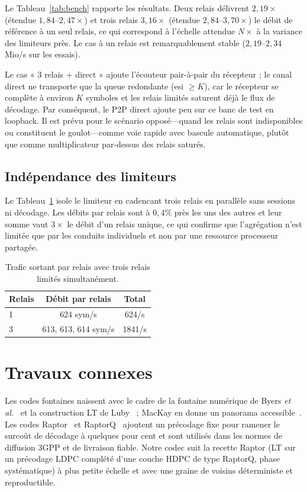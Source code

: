\documentclass[conference]{IEEEtran}
\begin{document}
Le Tableau~\ref{tab:bench} rapporte les résultats. Deux relais délivrent
$2{,}19\times$ (étendue $1{,}84$--$2{,}47\times$) et trois relais $3{,}16\times$
(étendue $2{,}84$--$3{,}70\times$) le débit de référence à un seul relais, ce
qui correspond à l'échelle attendue $N\times$ à la variance des limiteurs près.
Le cas à un relais est remarquablement stable ($2{,}19$--$2{,}34$\,Mio/s sur
les essais).

Le cas « 3 relais + direct » ajoute l'écouteur pair-à-pair du récepteur ; le
canal direct ne transporte que la queue redondante (esi $\ge K$), car le
récepteur se complète à environ $K$ symboles et les relais limités saturent
déjà le flux de décodage. Par conséquent, le P2P direct ajoute peu sur ce banc
de test en loopback. Il est prévu pour le scénario opposé---quand les relais
sont indisponibles ou constituent le goulot---comme voie rapide avec bascule
automatique, plutôt que comme multiplicateur par-dessus des relais saturés.

\subsection{Indépendance des limiteurs}
Le Tableau~\ref{tab:throttle} isole le limiteur en cadencant trois relais en
parallèle sans sessions ni décodage. Les débits par relais sont à $0{,}4\%$
près les uns des autres et leur somme vaut $3\times$ le débit d'un relais
unique, ce qui confirme que l'agrégation n'est limitée que par les conduits
individuels et non par une ressource processeur partagée.

\begin{table}[!t]
\centering
\caption{Trafic sortant par relais avec trois relais limités simultanément.}
\label{tab:throttle}
\begin{tabular}{@{}lcc@{}}
\toprule
Relais & Débit par relais & Total \\
\midrule
1 & 624 sym/s & 624/s \\
3 & 613, 613, 614 sym/s & 1841/s \\
\bottomrule
\end{tabular}
\end{table}

\section{Travaux connexes}
Les codes fontaines naissent avec le cadre de la fontaine numérique de
Byers \emph{et al.}~\cite{byers1998digital} et la construction LT de
Luby~\cite{luby2002lt} ; MacKay en donne un panorama
accessible~\cite{mackay2005fountain}. Les codes Raptor~\cite{shokrollahi2006raptor,rfc5053}
et RaptorQ~\cite{rfc6330} ajoutent un précodage fixe pour ramener le surcoût de
décodage à quelques pour cent et sont utilisés dans les normes de diffusion
3GPP et de livraison fiable. Notre codec suit la recette Raptor (LT sur un
précodage LDPC complété d'une couche HDPC de type RaptorQ, phase systématique)
à plus petite échelle et avec une graine de
voisins déterministe et reproductible.
\end{document}
